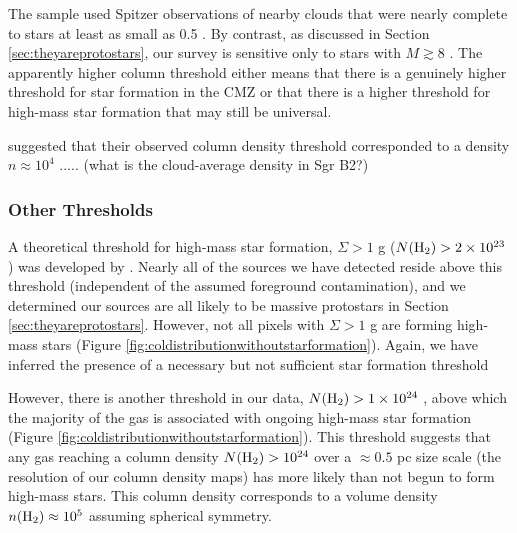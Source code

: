 \documentclass[twocolumn]{aastex61}
\begin{document}
The \citet{Lada2010a} sample used Spitzer observations of nearby clouds that
were nearly complete to stars at least as small as 0.5 \msun.  By contrast, as
discussed in Section \ref{sec:theyareprotostars}, our survey is sensitive only
to stars with $M\gtrsim8$ \msun.  The apparently higher column threshold either
means that there is a genuinely higher threshold for star formation in the CMZ
or that there is a higher threshold for high-mass star formation that may still
be universal.  

\citet{Lada2010a} suggested that their observed column density threshold
corresponded to a density $n\approx10^4$ \percc.....
(what is the cloud-average density in Sgr B2?)

\subsubsection{Other Thresholds}
\label{sec:otherthresholds}

A theoretical threshold for high-mass star formation, $\Sigma > 1$ g \persc
($N(\textrm{H}_{2}) > 2\times10^{23}$ \persc) was developed by \citet{Krumholz2008a}.   Nearly
all of the sources we have detected reside above this threshold (independent of
the assumed foreground contamination), and we determined our sources are all
likely to be massive protostars in Section \ref{sec:theyareprotostars}.
However, not all pixels with $\Sigma > 1$ g \persc are forming high-mass stars
(Figure \ref{fig:coldistributionwithoutstarformation}).  Again, we have
inferred the presence of a necessary but not sufficient star formation
threshold

However, there is another threshold in our data, $N(\textrm{H}_{2})>1\times10^{24}$ \persc,
above which the majority of the gas is associated with ongoing high-mass star
formation (Figure \ref{fig:coldistributionwithoutstarformation}).  This
threshold suggests that any gas reaching a column density $N(\textrm{H}_{2})>10^{24}$
\persc over a $\approx0.5$ pc size scale (the resolution of our column density
maps) has more likely than not begun to form high-mass stars.  This column
density corresponds to a volume density $n(\textrm{H}_{2})\approx10^5$ \percc assuming
spherical symmetry.


\end{document}
